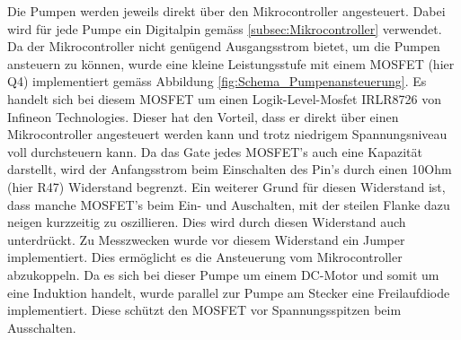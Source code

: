 Die Pumpen werden jeweils direkt über den Mikrocontroller angesteuert. Dabei wird für jede Pumpe ein Digitalpin gemäss \ref{subsec:Mikrocontroller} verwendet. Da der Mikrocontroller nicht genügend Ausgangsstrom bietet, um die Pumpen ansteuern zu können, wurde eine kleine Leistungsstufe mit einem MOSFET (hier Q4) implementiert gemäss Abbildung \ref{fig:Schema_Pumpenansteuerung}. Es handelt sich bei diesem MOSFET um einen Logik-Level-Mosfet IRLR8726 von Infineon Technologies. Dieser hat den Vorteil, dass er direkt über einen Mikrocontroller angesteuert werden kann und trotz niedrigem Spannungsniveau voll durchsteuern kann. Da das Gate jedes MOSFET's auch eine Kapazität darstellt, wird der Anfangsstrom beim Einschalten des Pin's durch einen 10Ohm (hier R47) Widerstand begrenzt. Ein weiterer Grund für diesen Widerstand ist, dass manche MOSFET's beim Ein- und Auschalten, mit der steilen Flanke dazu neigen kurzzeitig zu oszillieren. Dies wird durch diesen Widerstand auch unterdrückt. Zu Messzwecken wurde vor diesem Widerstand ein Jumper implementiert. Dies ermöglicht es die Ansteuerung vom Mikrocontroller abzukoppeln. Da es sich bei dieser Pumpe um einem DC-Motor und somit um eine Induktion handelt, wurde parallel zur Pumpe am Stecker eine Freilaufdiode implementiert. Diese schützt den MOSFET vor Spannungsspitzen beim Ausschalten. \cite[S.362]{atmel_atmel_2014} \cite{aiyimaindustrial_store_us_nodate} \cite{mouser_mp24943dn-lf_nodate}